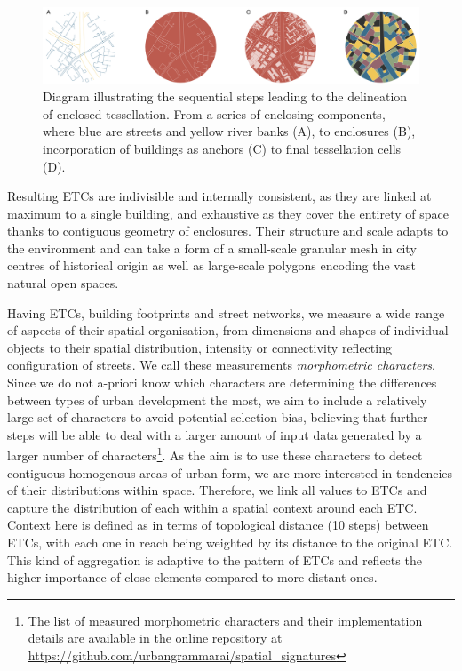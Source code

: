 \begin{figure}
    \includegraphics[width=\linewidth]{fig/et_diagram.pdf}
    \caption{Diagram illustrating the sequential steps leading to the delineation of
    enclosed tessellation. From a series of enclosing components, where blue are streets
    and yellow river banks (A), to enclosures (B), incorporation of buildings as anchors
    (C) to final tessellation cells (D).}
    \label{fig:et_diagram}
\end{figure}

Resulting ETCs are indivisible and internally consistent, as they are
linked at maximum to a single building, and exhaustive as they cover the entirety of space
thanks to contiguous geometry of enclosures. Their structure and scale adapts to the
environment and can take a form of a small-scale granular mesh in city centres of
historical origin as well as large-scale polygons encoding the vast natural open spaces.

Having ETCs, building footprints and street networks, we measure a wide range of aspects
of their spatial organisation, from dimensions and shapes of individual objects to their
spatial distribution, intensity or connectivity reflecting configuration of streets. We
call these measurements \textit{morphometric characters}. Since we do not a-priori know
which characters are determining the differences between types of urban
development the most, we aim to include a relatively large set of characters to
avoid potential selection bias, believing that further steps will be able to deal with a
larger amount of input data generated by a larger number of characters\footnote{The list
of measured morphometric characters and their implementation details are available in
the online repository at \url{https://github.com/urbangrammarai/spatial\_signatures}}. As the aim is
to use these characters to detect contiguous homogenous areas of urban form, we are more
interested in tendencies of their distributions within space. Therefore, we link all
values to ETCs and capture the distribution of each within a spatial context
around each ETC. Context here is defined as in terms of topological distance (10 steps)
between ETCs, with each one in reach being weighted by its distance to the original ETC. This
kind of aggregation is adaptive to the pattern of ETCs and reflects the higher importance
of close elements compared to more distant ones.

